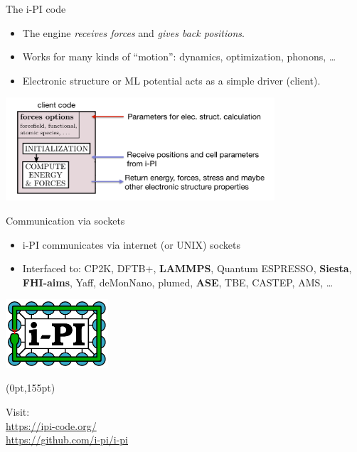 \documentclass[aspectratio=169]{beamer}
\begin{document}
\begin{frame}{The i-PI code}
\vspace*{1em}
\begin{itemize}
    \setlength{\itemsep}{1em}
    \item The engine \emph{receives forces} and \emph{gives back positions}.
    \item Works for many kinds of ``motion'': dynamics, optimization, phonons, \ldots
    \item Electronic structure or ML potential acts as a simple driver (client).
\end{itemize}

\medskip

\begin{center}
    \includegraphics[width=0.75\textwidth]{graphics/ipi-driver.png}
\end{center}
\end{frame}

\begin{frame}{Communication via sockets}
    \begin{itemize}
        \setlength{\itemsep}{1em}
        \item i-PI communicates via internet (or UNIX) sockets
        \item Interfaced to: CP2K, DFTB+, \textbf{LAMMPS}, Quantum
ESPRESSO, \textbf{Siesta}, \textbf{FHI-aims}, Yaff, deMonNano, plumed, \textbf{ASE}, TBE, CASTEP, AMS, \ldots
    \end{itemize}

\bigskip

\begin{center}
    \includegraphics[width=1.5in]{ipi-logo.pdf}
\end{center}

\begin{textblock*}{\paperwidth}(0pt,155pt)
      \hspace*{\fill}
      \parbox{2in}{
        Visit: \\
        \href{https://ipi-code.org/}{https://ipi-code.org/} \\
        \href{https://github.com/i-pi/i-pi}{https://github.com/i-pi/i-pi}
      }
\end{textblock*}
\end{frame}
\end{document}
